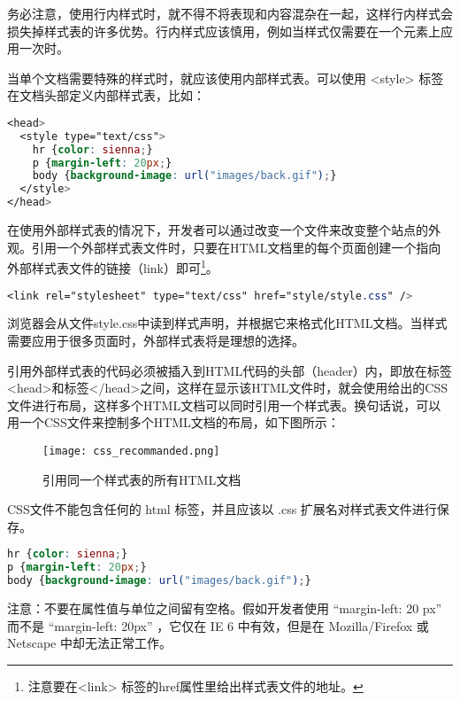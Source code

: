 务必注意，使用行内样式时，就不得不将表现和内容混杂在一起，这样行内样式会损失掉样式表的许多优势。行内样式应该慎用，例如当样式仅需要在一个元素上应用一次时。



当单个文档需要特殊的样式时，就应该使用内部样式表。可以使用 <style> 标签在文档头部定义内部样式表，比如：

\begin{lstlisting}[language=CSS]
<head>
  <style type="text/css">
    hr {color: sienna;}
    p {margin-left: 20px;}
    body {background-image: url("images/back.gif");}
  </style>
</head>
\end{lstlisting}



在使用外部样式表的情况下，开发者可以通过改变一个文件来改变整个站点的外观。引用一个外部样式表文件时，只要在HTML文档里的每个页面创建一个指向外部样式表文件的链接（link）即可\footnote{注意要在<link> 标签的href属性里给出样式表文件的地址。}。




\begin{lstlisting}[language=CSS]
<link rel="stylesheet" type="text/css" href="style/style.css" />
\end{lstlisting}

浏览器会从文件style.css中读到样式声明，并根据它来格式化HTML文档。当样式需要应用于很多页面时，外部样式表将是理想的选择。

引用外部样式表的代码必须被插入到HTML代码的头部（header）内，即放在标签<head>和标签</head>之间，这样在显示该HTML文件时，就会使用给出的CSS文件进行布局，这样多个HTML文档可以同时引用一个样式表。换句话说，可以用一个CSS文件来控制多个HTML文档的布局，如下图所示：

\begin{figure}[!h]
\centering
\texttt{[image: css\_recommanded.png]}
\caption{引用同一个样式表的所有HTML文档}
\label{css_recommanded}
\end{figure}

CSS文件不能包含任何的 html 标签，并且应该以 .css 扩展名对样式表文件进行保存。

\begin{lstlisting}[language=CSS]
hr {color: sienna;}
p {margin-left: 20px;}
body {background-image: url("images/back.gif");}
\end{lstlisting}

注意：不要在属性值与单位之间留有空格。假如开发者使用 “margin-left: 20 px” 而不是 “margin-left: 20px” ，它仅在 IE 6 中有效，但是在 Mozilla/Firefox 或 Netscape 中却无法正常工作。

